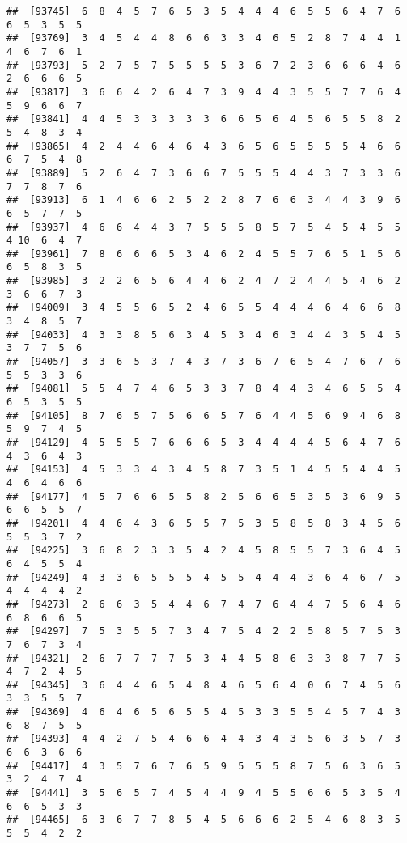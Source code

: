 \documentclass[
]{book}
\begin{document}
\begin{verbatim}
##  [93745]  6  8  4  5  7  6  5  3  5  4  4  4  6  5  5  6  4  7  6  6  5  3  5  5
##  [93769]  3  4  5  4  4  8  6  6  3  3  4  6  5  2  8  7  4  4  1  4  6  7  6  1
##  [93793]  5  2  7  5  7  5  5  5  5  3  6  7  2  3  6  6  6  4  6  2  6  6  6  5
##  [93817]  3  6  6  4  2  6  4  7  3  9  4  4  3  5  5  7  7  6  4  5  9  6  6  7
##  [93841]  4  4  5  3  3  3  3  3  6  6  5  6  4  5  6  5  5  8  2  5  4  8  3  4
##  [93865]  4  2  4  4  6  4  6  4  3  6  5  6  5  5  5  5  4  6  6  6  7  5  4  8
##  [93889]  5  2  6  4  7  3  6  6  7  5  5  5  4  4  3  7  3  3  6  7  7  8  7  6
##  [93913]  6  1  4  6  6  2  5  2  2  8  7  6  6  3  4  4  3  9  6  6  5  7  7  5
##  [93937]  4  6  6  4  4  3  7  5  5  5  8  5  7  5  4  5  4  5  5  4 10  6  4  7
##  [93961]  7  8  6  6  6  5  3  4  6  2  4  5  5  7  6  5  1  5  6  6  5  8  3  5
##  [93985]  3  2  2  6  5  6  4  4  6  2  4  7  2  4  4  5  4  6  2  3  6  6  7  3
##  [94009]  3  4  5  5  6  5  2  4  6  5  5  4  4  4  6  4  6  6  8  3  4  8  5  7
##  [94033]  4  3  3  8  5  6  3  4  5  3  4  6  3  4  4  3  5  4  5  3  7  7  5  6
##  [94057]  3  3  6  5  3  7  4  3  7  3  6  7  6  5  4  7  6  7  6  5  5  3  3  6
##  [94081]  5  5  4  7  4  6  5  3  3  7  8  4  4  3  4  6  5  5  4  6  5  3  5  5
##  [94105]  8  7  6  5  7  5  6  6  5  7  6  4  4  5  6  9  4  6  8  5  9  7  4  5
##  [94129]  4  5  5  5  7  6  6  6  5  3  4  4  4  4  5  6  4  7  6  4  3  6  4  3
##  [94153]  4  5  3  3  4  3  4  5  8  7  3  5  1  4  5  5  4  4  5  4  6  4  6  6
##  [94177]  4  5  7  6  6  5  5  8  2  5  6  6  5  3  5  3  6  9  5  6  6  5  5  7
##  [94201]  4  4  6  4  3  6  5  5  7  5  3  5  8  5  8  3  4  5  6  5  5  3  7  2
##  [94225]  3  6  8  2  3  3  5  4  2  4  5  8  5  5  7  3  6  4  5  6  4  5  5  4
##  [94249]  4  3  3  6  5  5  5  4  5  5  4  4  4  3  6  4  6  7  5  4  4  4  4  2
##  [94273]  2  6  6  3  5  4  4  6  7  4  7  6  4  4  7  5  6  4  6  6  8  6  6  5
##  [94297]  7  5  3  5  5  7  3  4  7  5  4  2  2  5  8  5  7  5  3  7  6  7  3  4
##  [94321]  2  6  7  7  7  7  5  3  4  4  5  8  6  3  3  8  7  7  5  4  7  2  4  5
##  [94345]  3  6  4  4  6  5  4  8  4  6  5  6  4  0  6  7  4  5  6  3  3  5  5  7
##  [94369]  4  6  4  6  5  6  5  5  4  5  3  3  5  5  4  5  7  4  3  6  8  7  5  5
##  [94393]  4  4  2  7  5  4  6  6  4  4  3  4  3  5  6  3  5  7  3  6  6  3  6  6
##  [94417]  4  3  5  7  6  7  6  5  9  5  5  5  8  7  5  6  3  6  5  3  2  4  7  4
##  [94441]  3  5  6  5  7  4  5  4  4  9  4  5  5  6  6  5  3  5  4  6  6  5  3  3
##  [94465]  6  3  6  7  7  8  5  4  5  6  6  6  2  5  4  6  8  3  5  5  5  4  2  2

\end{verbatim}
\end{document}
